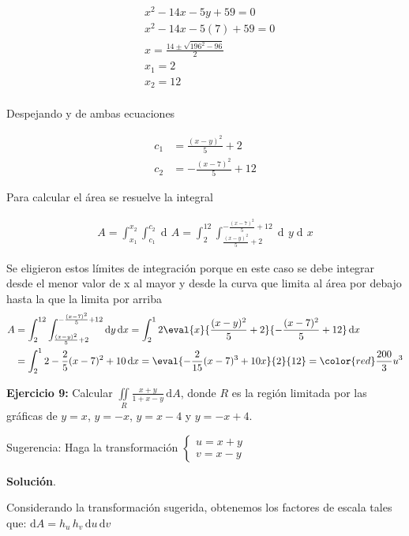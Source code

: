 \documentclass[12pt]{article}
\DeclareMathOperator{\di}{d\!}
\begin{document}
\begin{align*}
	&x^2 -14x -5y +59 = 0 \\
	&x^2 -14x -5(7) +59 = 0 \\
	&x = \frac{14 \pm \sqrt{196^2-96 }}{2} \\
	&x_1 = 2 \\
	&x_2 = 12 \\
\end{align*}

Despejando y de ambas ecuaciones

\begin{align*}
	c_1 &= \frac{(x-y)^2}{5} + 2 \\
	c_2 &= -\frac{(x-7)^2}{5}+12
\end{align*}

Para calcular el área se resuelve la integral 

\begin{align*}
	A = \int_{x_1}^{x_2} \int_{c_1}^{c_2} \di A = \int_{2}^{12} \int_{\frac{(x-y)^2}{5} + 2}^{-\frac{(x-7)^2}{5}+12} \di y \di x
\end{align*}

Se eligieron estos límites de integración porque en este caso se debe integrar desde el menor
valor de x al mayor y desde la curva que limita al área por debajo hasta la que la limita
por arriba
\begin{align*}
A &= \int_{2}^{12} \int_{\frac{(x-y)^2}{5} + 2}^{-\frac{(x-7)^2}{5}+12} \di y \di x 
= \int_2^12 \eval{x}{\frac{(x-y)^2}{5} + 2}{-\frac{(x-7)^2}{5}+12} \di x \\
&= \int_2^12 -\frac{2}{5}(x-7)^2+10 \di x = \eval{-\frac{2}{15}(x-7)^3+10x}{2}{12}
=\color{red}\frac{200}{3} u^3 
\end{align*}

\noindent \textbf{Ejercicio 9:} Calcular $\iint\limits_R \frac{x+y}{1+x-y}\, \mathrm{d}A$, donde $R$ es la región limitada por las gráficas de $y=x$, $y=-x$, $y=x-4$ y $y=-x+4$.

\vspace{3mm}

\noindent Sugerencia: Haga la transformación $\begin{cases} u = x+y\\v=x-y\end{cases}$

\noindent \textbf{Solución}.

\vspace{3mm}

\noindent Considerando la transformación sugerida, obtenemos los factores de escala tales que: $\mathrm{d}A = h_u\,h_v\,\mathrm{d}u\,\mathrm{d}v$
\end{document}
